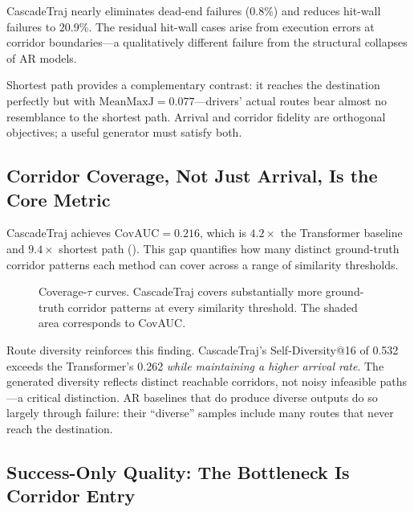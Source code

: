 CascadeTraj nearly eliminates dead-end failures (0.8\%) and reduces hit-wall failures to 20.9\%.
The residual hit-wall cases arise from execution errors at corridor boundaries---a qualitatively different failure from the structural collapses of AR models.

Shortest path provides a complementary contrast: it reaches the destination perfectly but with $\mathrm{MeanMaxJ} = 0.077$---drivers' actual routes bear almost no resemblance to the shortest path.
Arrival and corridor fidelity are orthogonal objectives; a useful generator must satisfy both.

\subsection{Corridor Coverage, Not Just Arrival, Is the Core Metric}

CascadeTraj achieves $\mathrm{CovAUC} = 0.216$, which is $4.2\times$ the Transformer baseline and $9.4\times$ shortest path ().
This gap quantifies how many distinct ground-truth corridor patterns each method can cover across a range of similarity thresholds.

\begin{figure}[t]
  \centering
  \caption{Coverage-$\tau$ curves. CascadeTraj covers substantially more ground-truth corridor patterns at every similarity threshold. The shaded area corresponds to CovAUC.}
  \label{fig:coverage-tau}
\end{figure}

Route diversity reinforces this finding.
CascadeTraj's Self-Diversity@16 of 0.532 exceeds the Transformer's 0.262 \emph{while maintaining a higher arrival rate}.
The generated diversity reflects distinct reachable corridors, not noisy infeasible paths---a critical distinction.
AR baselines that do produce diverse outputs do so largely through failure: their ``diverse'' samples include many routes that never reach the destination.

\subsection{Success-Only Quality: The Bottleneck Is Corridor Entry}

